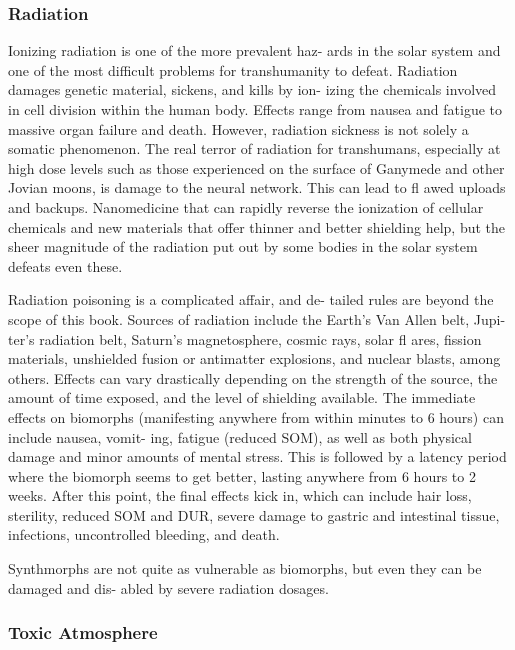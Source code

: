 \subsubsection{Radiation}

Ionizing radiation is one of the more prevalent haz-
ards in the solar system and one of the most difficult 
problems for transhumanity to defeat. Radiation 
damages genetic material, sickens, and kills by ion-
izing the chemicals involved in cell division within the 
human body. Effects range from nausea and fatigue to 
massive organ failure and death. However, radiation 
sickness is not solely a somatic phenomenon. The real 
terror of radiation for transhumans, especially at high 
dose levels such as those experienced on the surface of 
Ganymede and other Jovian moons, is damage to the 
neural network. This can lead to fl awed uploads and 
backups. Nanomedicine that can rapidly reverse the 
ionization of cellular chemicals and new materials that 
offer thinner and better shielding help, but the sheer 
magnitude of the radiation put out by some bodies in 
the solar system defeats even these.

Radiation poisoning is a complicated affair, and de-
tailed rules are beyond the scope of this book. Sources 
of radiation include the Earth's Van Allen belt, Jupi-
ter's radiation belt, Saturn's magnetosphere, cosmic 
rays, solar fl ares, fission materials, unshielded fusion 
or antimatter explosions, and nuclear blasts, among 
others. Effects can vary drastically depending on the 
strength of the source, the amount of time exposed, 
and the level of shielding available. The immediate 
effects on biomorphs (manifesting anywhere from 
within minutes to 6 hours) can include nausea, vomit-
ing, fatigue (reduced SOM), as well as both physical 
damage and minor amounts of mental stress. This 
is followed by a latency period where the biomorph 
seems to get better, lasting anywhere from 6 hours 
to 2 weeks. After this point, the final effects kick in, 
which can include hair loss, sterility, reduced SOM 
and DUR, severe damage to gastric and intestinal 
tissue, infections, uncontrolled bleeding, and death.

Synthmorphs are not quite as vulnerable as 
biomorphs, but even they can be damaged and dis-
abled by severe radiation dosages.

\subsubsection{Toxic Atmosphere}

